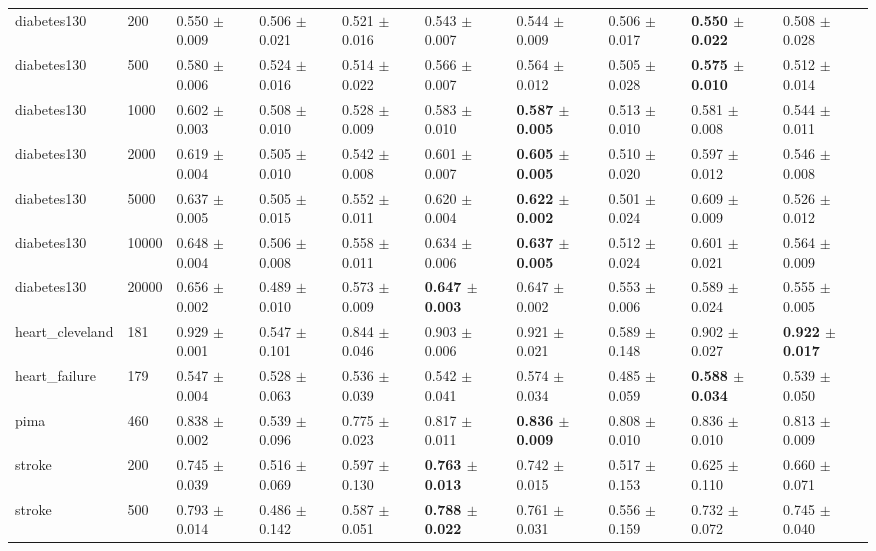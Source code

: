 \begin{table}
\begin{tabular}{llllllllll}
diabetes130 & 200 & 0.550 $\pm$ 0.009 & 0.506 $\pm$ 0.021 & 0.521 $\pm$ 0.016 & 0.543 $\pm$ 0.007 & 0.544 $\pm$ 0.009 & 0.506 $\pm$ 0.017 & \textbf{0.550 $\pm$ 0.022} & 0.508 $\pm$ 0.028 \\
diabetes130 & 500 & 0.580 $\pm$ 0.006 & 0.524 $\pm$ 0.016 & 0.514 $\pm$ 0.022 & 0.566 $\pm$ 0.007 & 0.564 $\pm$ 0.012 & 0.505 $\pm$ 0.028 & \textbf{0.575 $\pm$ 0.010} & 0.512 $\pm$ 0.014 \\
diabetes130 & 1000 & 0.602 $\pm$ 0.003 & 0.508 $\pm$ 0.010 & 0.528 $\pm$ 0.009 & 0.583 $\pm$ 0.010 & \textbf{0.587 $\pm$ 0.005} & 0.513 $\pm$ 0.010 & 0.581 $\pm$ 0.008 & 0.544 $\pm$ 0.011 \\
diabetes130 & 2000 & 0.619 $\pm$ 0.004 & 0.505 $\pm$ 0.010 & 0.542 $\pm$ 0.008 & 0.601 $\pm$ 0.007 & \textbf{0.605 $\pm$ 0.005} & 0.510 $\pm$ 0.020 & 0.597 $\pm$ 0.012 & 0.546 $\pm$ 0.008 \\
diabetes130 & 5000 & 0.637 $\pm$ 0.005 & 0.505 $\pm$ 0.015 & 0.552 $\pm$ 0.011 & 0.620 $\pm$ 0.004 & \textbf{0.622 $\pm$ 0.002} & 0.501 $\pm$ 0.024 & 0.609 $\pm$ 0.009 & 0.526 $\pm$ 0.012 \\
diabetes130 & 10000 & 0.648 $\pm$ 0.004 & 0.506 $\pm$ 0.008 & 0.558 $\pm$ 0.011 & 0.634 $\pm$ 0.006 & \textbf{0.637 $\pm$ 0.005} & 0.512 $\pm$ 0.024 & 0.601 $\pm$ 0.021 & 0.564 $\pm$ 0.009 \\
diabetes130 & 20000 & 0.656 $\pm$ 0.002 & 0.489 $\pm$ 0.010 & 0.573 $\pm$ 0.009 & \textbf{0.647 $\pm$ 0.003} & 0.647 $\pm$ 0.002 & 0.553 $\pm$ 0.006 & 0.589 $\pm$ 0.024 & 0.555 $\pm$ 0.005 \\
heart\_cleveland & 181 & 0.929 $\pm$ 0.001 & 0.547 $\pm$ 0.101 & 0.844 $\pm$ 0.046 & 0.903 $\pm$ 0.006 & 0.921 $\pm$ 0.021 & 0.589 $\pm$ 0.148 & 0.902 $\pm$ 0.027 & \textbf{0.922 $\pm$ 0.017} \\
heart\_failure & 179 & 0.547 $\pm$ 0.004 & 0.528 $\pm$ 0.063 & 0.536 $\pm$ 0.039 & 0.542 $\pm$ 0.041 & 0.574 $\pm$ 0.034 & 0.485 $\pm$ 0.059 & \textbf{0.588 $\pm$ 0.034} & 0.539 $\pm$ 0.050 \\
pima & 460 & 0.838 $\pm$ 0.002 & 0.539 $\pm$ 0.096 & 0.775 $\pm$ 0.023 & 0.817 $\pm$ 0.011 & \textbf{0.836 $\pm$ 0.009} & 0.808 $\pm$ 0.010 & 0.836 $\pm$ 0.010 & 0.813 $\pm$ 0.009 \\
stroke & 200 & 0.745 $\pm$ 0.039 & 0.516 $\pm$ 0.069 & 0.597 $\pm$ 0.130 & \textbf{0.763 $\pm$ 0.013} & 0.742 $\pm$ 0.015 & 0.517 $\pm$ 0.153 & 0.625 $\pm$ 0.110 & 0.660 $\pm$ 0.071 \\
stroke & 500 & 0.793 $\pm$ 0.014 & 0.486 $\pm$ 0.142 & 0.587 $\pm$ 0.051 & \textbf{0.788 $\pm$ 0.022} & 0.761 $\pm$ 0.031 & 0.556 $\pm$ 0.159 & 0.732 $\pm$ 0.072 & 0.745 $\pm$ 0.040 \\

\end{tabular}
\end{table}
